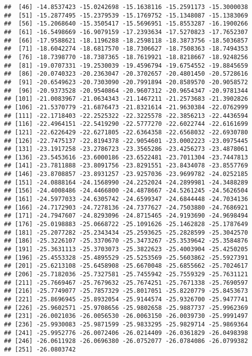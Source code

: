 \documentclass[]{article}
\begin{document}
\begin{verbatim}
##  [46] -14.8537423 -15.0242698 -15.1638116 -15.2591173 -15.3000038
##  [51] -15.2877495 -15.2379539 -15.1769752 -15.1348087 -15.1383069
##  [56] -15.2068640 -15.3505417 -15.5696951 -15.8553287 -16.1900266
##  [61] -16.5498669 -16.9079159 -17.2393634 -17.5270823 -17.7652307
##  [66] -17.9588621 -18.1196288 -18.2598118 -18.3873756 -18.5036857
##  [71] -18.6042274 -18.6817570 -18.7306627 -18.7508363 -18.7494353
##  [76] -18.7398770 -18.7387365 -18.7619921 -18.8218667 -18.9248256
##  [81] -19.0707331 -19.2530039 -19.4596794 -19.6754552 -19.8845659
##  [86] -20.0740323 -20.2363047 -20.3702657 -20.4801450 -20.5728616
##  [91] -20.6549623 -20.7303090 -20.7991894 -20.8589570 -20.9058572
##  [96] -20.9373528 -20.9540864 -20.9607312 -20.9654347 -20.9781344
## [101] -21.0083967 -21.0634343 -21.1467211 -21.2573683 -21.3902826
## [106] -21.5370779 -21.6876473 -21.8321614 -21.9630384 -22.0762999
## [111] -22.1718403 -22.2525322 -22.3225578 -22.3856213 -22.4436594
## [116] -22.4964151 -22.5419290 -22.5777270 -22.6022744 -22.6161699
## [121] -22.6226429 -22.6271805 -22.6364358 -22.6568032 -22.6930780
## [126] -22.7475137 -22.8194378 -22.9054601 -23.0002223 -23.0975445
## [131] -23.1917258 -23.2786723 -23.3565286 -23.4256273 -23.4878061
## [136] -23.5453616 -23.6000186 -23.6522481 -23.7011304 -23.7447813
## [141] -23.7811888 -23.8091756 -23.8291551 -23.8434078 -23.8557769
## [146] -23.8708857 -23.8931257 -23.9257036 -23.9699782 -24.0252185
## [151] -24.0888164 -24.1568990 -24.2252024 -24.2899981 -24.3488289
## [156] -24.4008486 -24.4466800 -24.4878667 -24.5261245 -24.5626504
## [161] -24.5977033 -24.6305742 -24.6599347 -24.6844448 -24.7034136
## [166] -24.7172903 -24.7278136 -24.7377627 -24.7503880 -24.7686921
## [171] -24.7947607 -24.8293096 -24.8715465 -24.9193690 -24.9698494
## [176] -25.0198883 -25.0668722 -25.1091626 -25.1462828 -25.1787649
## [181] -25.2077282 -25.2343434 -25.2593625 -25.2828599 -25.3042570
## [186] -25.3226107 -25.3370670 -25.3473267 -25.3539642 -25.3584876
## [191] -25.3631113 -25.3703073 -25.3822623 -25.4003904 -25.4250205
## [196] -25.4553328 -25.4895529 -25.5253569 -25.5603862 -25.5927391
## [201] -25.6213108 -25.6458908 -25.6670048 -25.6855662 -25.7024617
## [206] -25.7182036 -25.7327581 -25.7455942 -25.7559329 -25.7631121
## [211] -25.7669467 -25.7679632 -25.7674251 -25.7671338 -25.7690597
## [216] -25.7749077 -25.7857329 -25.8017051 -25.8220779 -25.8453673
## [221] -25.8696945 -25.8932054 -25.9144574 -25.9326700 -25.9477741
## [226] -25.9602571 -25.9708656 -25.9802658 -25.9887737 -25.9962369
## [231] -26.0021036 -26.0056530 -26.0063150 -26.0039730 -25.9991497
## [236] -25.9930083 -25.9871599 -25.9833295 -25.9829714 -25.9869364
## [241] -25.9952776 -26.0072406 -26.0214409 -26.0361829 -26.0498398
## [246] -26.0611928 -26.0696380 -26.0752077 -26.0784086 -26.0799382
## [251] -26.0803742
\end{verbatim}
\end{document}
